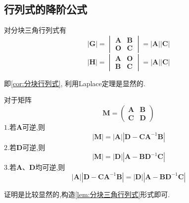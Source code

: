 \subsection{行列式的降阶公式}
\begin{green}
\begin{lemma}[分块三角行列式]\label{lem:分块三角行列式}
    对分块三角行列式有
    \[
    \left|\bm{G}\right| = 
    \begin{vmatrix}
        \bm{A} & \bm{B} \\
        \bm{O} & \bm{C} 
    \end{vmatrix} 
    = \left|\bm{A}\right|
    \left|\bm{C}\right|
    \]
    \[
    \left|\bm{H}\right| = 
    \begin{vmatrix}
        \bm{A} & \bm{O} \\
        \bm{B} & \bm{C} 
    \end{vmatrix} 
    = \left|\bm{A}\right|
    \left|\bm{C}\right|
    \]
\end{lemma}
\begin{Proof}
    即\cref{cor:分块行列式},
利用Laplace定理是显然的.
\end{Proof}
\end{green}
\begin{formal}
\begin{theorem}[分块矩阵行列式降阶公式]\label{thm:分块矩阵行列式降阶公式}
    对于矩阵
    \[
    \bm{M} = \begin{pmatrix}
        \bm{A} & \bm{B} \\
        \bm{C} & \bm{D} 
    \end{pmatrix}
    \]
$1.$若$\bm{A}$可逆,则
\[
\left|\bm{M}\right| = \left|\bm{A}
\right|\left|\bm{D} - \bm{C}\bm{A}
^{-1}\bm{B}\right|
\]
$2.$若$\bm{D}$可逆,则\[
\left|\bm{M}\right| = \left|
    \bm{D}
\right|\left|
    \bm{A} - \bm{B}\bm{D}^{-1}
    \bm{C}
\right|
\]
$3.$若$\bm{A}$、$\bm{D}$均可逆,则
\[
\left|\bm{A}
\right|\left|\bm{D} - \bm{C}\bm{A}
^{-1}\bm{B}\right|
=
\left|
    \bm{D}
\right|\left|
    \bm{A} - \bm{B}\bm{D}^{-1}
    \bm{C}
\right|
\]
\end{theorem}
\begin{Proof}
证明是比较显然的,构造\cref{lem:分块三角行列式}形式即可.
\end{Proof}
\end{formal}
